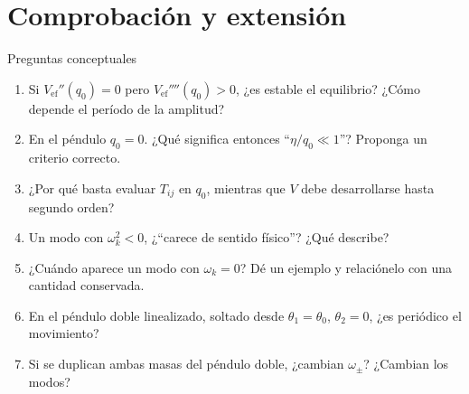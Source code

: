 \documentclass[spanish]{beamer}
\newcommand{\Vef}{V_{\mathrm{ef}}}
\begin{document}
\section{Comprobación y extensión}
\begin{frame}{Preguntas conceptuales}
\begin{enumerate}
\item<1-> Si $\Vef''(q_0)=0$ pero $\Vef''''(q_0)>0$, ¿es estable el equilibrio? ¿Cómo depende el período de la amplitud?
\item<2-> En el péndulo $q_0=0$. ¿Qué significa entonces ``$\eta/q_0\ll1$''? Proponga un criterio correcto.
\item<3-> ¿Por qué basta evaluar $T_{ij}$ en $q_0$, mientras que $V$ debe desarrollarse hasta segundo orden?
\item<4-> Un modo con $\omega_k^2<0$, ¿``carece de sentido físico''? ¿Qué describe?
\item<5-> ¿Cuándo aparece un modo con $\omega_k=0$? Dé un ejemplo y relaciónelo con una cantidad conservada.
\item<6-> En el péndulo doble linealizado, soltado desde $\theta_1=\theta_0$, $\theta_2=0$, ¿es periódico el movimiento?
\item<7-> Si se duplican ambas masas del péndulo doble, ¿cambian $\omega_\pm$? ¿Cambian los modos?
\end{enumerate}
\end{frame}
\end{document}
